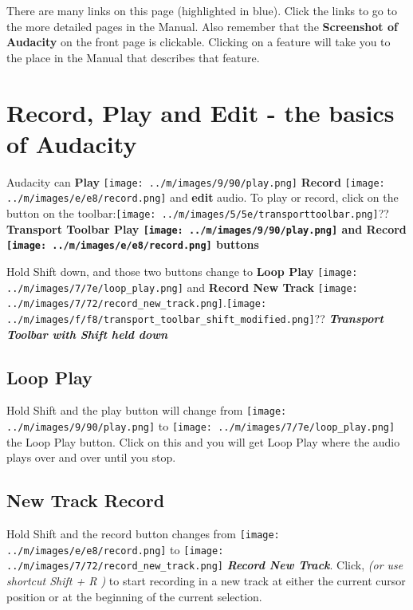 \documentclass[twocolumn]{book}
\begin{document}
There are many links on this page (highlighted in blue). Click the links to go to the more detailed pages in the Manual. 
Also remember that the \textbf{Screenshot of Audacity} on the front page is clickable.  Clicking on a feature will take you to the place in the Manual that describes that feature. 



\section{Record, Play and Edit - the basics of Audacity}


Audacity can \textbf{Play} \texttt{[image: ../m/images/9/90/play.png]} \textbf{Record} \texttt{[image: ../m/images/e/e8/record.png]} and  \textbf{edit} audio.  To play or record, click on the button on the toolbar:\texttt{[image: ../m/images/5/5e/transporttoolbar.png]}??
\textbf{Transport Toolbar Play \texttt{[image: ../m/images/9/90/play.png]} and Record \texttt{[image: ../m/images/e/e8/record.png]} buttons}


Hold Shift down, and those two buttons change to \textbf{Loop Play} \texttt{[image: ../m/images/7/7e/loop\_play.png]} and \textbf{Record New Track} \texttt{[image: ../m/images/7/72/record\_new\_track.png]}.\texttt{[image: ../m/images/f/f8/transport\_toolbar\_shift\_modified.png]}??
\textit{\textbf{Transport Toolbar with Shift held down}}

\subsection{Loop Play}


Hold Shift and the play button will change from \texttt{[image: ../m/images/9/90/play.png]} to \texttt{[image: ../m/images/7/7e/loop\_play.png]} the Loop Play button. Click on this and you will get Loop Play where the audio plays over and over until you stop.  

\subsection{New Track Record}


Hold Shift and the record button changes from \texttt{[image: ../m/images/e/e8/record.png]} to \texttt{[image: ../m/images/7/72/record\_new\_track.png]} \textit{\textbf{Record New Track}}.  Click, \textit{(or use shortcut Shift + R )} to start recording in a new track at either the current cursor position or at the beginning of the current selection.
\end{document}
